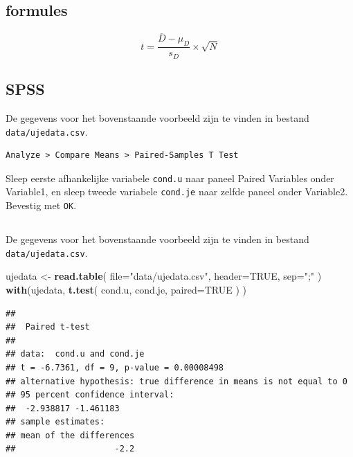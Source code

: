 \documentclass[
]{book}
\newenvironment{Shaded}{\begin{snugshade}}{\end{snugshade}}
\newcommand{\DataTypeTok}[1]{\textcolor[rgb]{0.13,0.29,0.53}{#1}}
\newcommand{\KeywordTok}[1]{\textcolor[rgb]{0.13,0.29,0.53}{\textbf{#1}}}
\newcommand{\NormalTok}[1]{#1}
\newcommand{\OtherTok}[1]{\textcolor[rgb]{0.56,0.35,0.01}{#1}}
\newcommand{\StringTok}[1]{\textcolor[rgb]{0.31,0.60,0.02}{#1}}
\begin{document}
\hypertarget{sec:formules13-4}{%
\subsection{formules}\label{sec:formules13-4}}

\begin{equation}
  \label{eq:t-pairedsamples}
  t = \frac{ \overline{D}-\mu_D} { s_D } \times \sqrt{N}
\end{equation}

\hypertarget{sec:SPSS-ttoets-gepaard}{%
\subsection{SPSS}\label{sec:SPSS-ttoets-gepaard}}

De gegevens voor het bovenstaande voorbeeld zijn te vinden in bestand \texttt{data/ujedata.csv}.

\begin{verbatim}
Analyze > Compare Means > Paired-Samples T Test
\end{verbatim}

Sleep eerste afhankelijke variabele \texttt{cond.u} naar paneel Paired
Variables onder Variable1, en sleep tweede variabele \texttt{cond.je} naar
zelfde paneel onder Variable2. Bevestig met \texttt{OK}.

\hypertarget{sec:R-ttoets-gepaard}{%
\subsection{}\label{sec:R-ttoets-gepaard}}

De gegevens voor het bovenstaande voorbeeld zijn te vinden in bestand \texttt{data/ujedata.csv}.

\begin{Shaded}
\begin{Highlighting}[]
\NormalTok{ujedata \textless{}{-}}\StringTok{ }\KeywordTok{read.table}\NormalTok{( }\DataTypeTok{file=}\StringTok{"data/ujedata.csv"}\NormalTok{, }\DataTypeTok{header=}\OtherTok{TRUE}\NormalTok{, }\DataTypeTok{sep=}\StringTok{";"}\NormalTok{ )}
\KeywordTok{with}\NormalTok{(ujedata, }\KeywordTok{t.test}\NormalTok{( cond.u, cond.je, }\DataTypeTok{paired=}\OtherTok{TRUE}\NormalTok{ ) )}
\end{Highlighting}
\end{Shaded}

\begin{verbatim}
## 
##  Paired t-test
## 
## data:  cond.u and cond.je
## t = -6.7361, df = 9, p-value = 0.00008498
## alternative hypothesis: true difference in means is not equal to 0
## 95 percent confidence interval:
##  -2.938817 -1.461183
## sample estimates:
## mean of the differences 
##                    -2.2
\end{verbatim}
\end{document}
